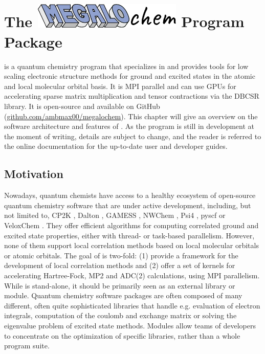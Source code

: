 \chapter[The \mchem Program Package]{The \protect\includegraphics[height=34pt]{Pics/MEGALOCHEM.pdf} Program Package}


\mchem{} is a quantum chemistry program that specializes in and provides tools for low scaling electronic structure methods for ground and excited states in the atomic and local molecular orbital basis. It is  MPI parallel and can use GPUs for accelerating sparse matrix multiplication and tensor contractions via the DBCSR library. It is open-source and available on GitHub (\url{github.com/ambmax00/megalochem}). This chapter will give an overview on the software architecture and features of \mchem{}. As the program is still in development at the moment of writing, details are subject to change, and the reader is referred to the online documentation for the up-to-date user and developer guides.

\section{Motivation}

Nowadays, quantum chemists have access to a healthy ecosystem of open-source quantum chemistry software that are under active development, including, but not limited to, CP2K \cite{}, Dalton \cite{}, GAMESS \cite{}, NWChem \cite{}, Psi4 \cite{}, pyscf \cite{} or VeloxChem \cite{}. They offer efficient algorithms for computing correlated ground and excited state properties, either with thread- or task-based parallelism. However, none of them support local correlation methods based on local molecular orbitals or atomic orbitals. The goal of \mchem{} is two-fold: (1) provide a framework for the development of local correlation methods and (2) offer a set of kernels for accelerating Hartree-Fock, MP2 and ADC(2) calculations, using MPI parallelism. While \mchem{} is stand-alone, it should be primarily seen as an external library or module. Quantum chemistry software packages are often composed of many different, often quite sophisticated libraries that handle e.g. evaluation of electron integrals, computation of the coulomb and exchange matrix or solving the eigenvalue problem of excited state methods. Modules allow teams of developers to concentrate on the optimization of specific libraries, rather than a whole program suite. %

